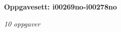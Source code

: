 \centerline{\bf Oppgavesett: i00269no-i00278no}
\vskip 10pt
\centerline{\it 10 oppgaver}\vskip 10pt
\vskip 10pt
